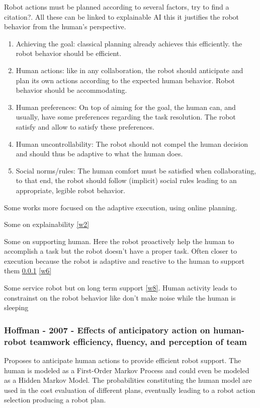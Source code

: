 Robot actions must be planned according to several factors, try to find a citation?. All these can be linked to explainable AI this it justifies the robot behavior from the human's perspective. 

\begin{enumerate}
    \item Achieving the goal: classical planning already achieves this efficiently. the robot behavior should be efficient.
    \item Human actions: like in any collaboration, the robot should anticipate and plan its own actions according to the expected human behavior.  Robot behavior should be accommodating.
    \item Human preferences: On top of aiming for the goal, the human can, and usually, have some preferences regarding the task resolution. The robot satisfy and allow to satisfy these preferences.
    \item Human uncontrollability: The robot should not compel the human decision and should thus be adaptive to what the human does.
    \item Social norms/rules: The human comfort must be satisfied when collaborating, to that end, the robot should follow (implicit) social rules leading to an appropriate, legible robot behavior.
\end{enumerate}

Some works more focused on the adaptive execution, using online planning. 

Some on explainability \ref{w2}

Some on supporting human. Here the robot proactively help the human to accomplish a task but the robot doesn't have a proper task. Often closer to execution because the robot is adaptive and reactive to the human to support them \ref{w1} \ref{w6}

Some service robot but on long term support \ref{w8}. Human activity leads to constrainst on the robot behavior like don't make noise while the human is sleeping  

\subsubsection{Hoffman - 2007 - Effects of anticipatory action on human-robot teamwork efficiency, fluency, and perception of team}
\label{w1}

Proposes to anticipate human actions to provide efficient robot support. The human is modeled as a First-Order Markov Process and could even be modeled as a Hidden Markov Model. The probabilities constituting the human model are used in the cost evaluation of different plans, eventually leading to a robot action selection producing a robot plan. 

